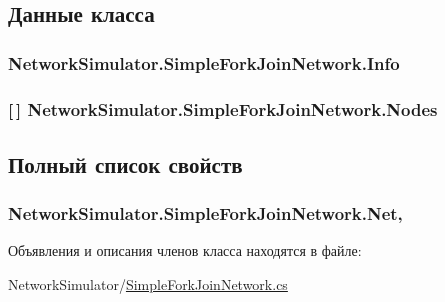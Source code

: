\subsection{Данные класса}
\subsubsection[{\texorpdfstring{Info}{Info}}]{ Network\+Simulator.\+Simple\+Fork\+Join\+Network.\+Info}\hypertarget{class_network_simulator_1_1_simple_fork_join_network_a066c8726b2e06ff097ceac9bc5da6b06}{}\label{class_network_simulator_1_1_simple_fork_join_network_a066c8726b2e06ff097ceac9bc5da6b06}
\subsubsection[{\texorpdfstring{Nodes}{Nodes}}]{ \mbox{[}$\,$\mbox{]} Network\+Simulator.\+Simple\+Fork\+Join\+Network.\+Nodes}\hypertarget{class_network_simulator_1_1_simple_fork_join_network_a4fcb433275926794391a8665b613e35a}{}\label{class_network_simulator_1_1_simple_fork_join_network_a4fcb433275926794391a8665b613e35a}


\subsection{Полный список свойств}
\subsubsection[{\texorpdfstring{Net}{Net}}]{ Network\+Simulator.\+Simple\+Fork\+Join\+Network.\+Net\hspace{0.3cm}{\ttfamily [get]}, {\ttfamily [set]}}\hypertarget{class_network_simulator_1_1_simple_fork_join_network_ab7e5ce5b98f06c7f436e99aa3ee3ecb0}{}\label{class_network_simulator_1_1_simple_fork_join_network_ab7e5ce5b98f06c7f436e99aa3ee3ecb0}


Объявления и описания членов класса находятся в файле\+:\begin{DoxyCompactItemize}
\item 
Network\+Simulator/\hyperlink{_simple_fork_join_network_8cs}{Simple\+Fork\+Join\+Network.\+cs}\end{DoxyCompactItemize}
